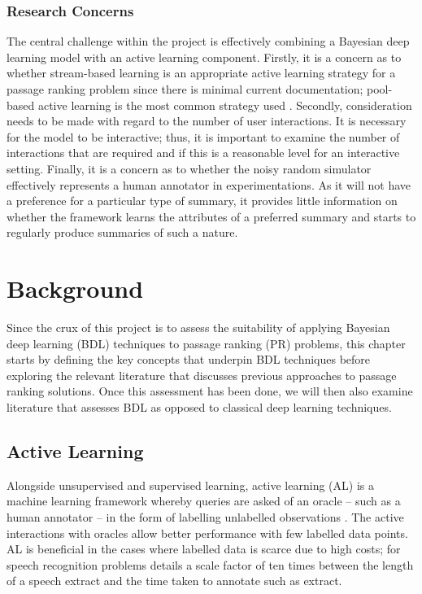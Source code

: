 \documentclass[ %
                    author={James Stephenson},
                supervisor={Dr. Edwin Simpson},
                    degree={MSc},
                     title={PROJECT PLAN},
                  subtitle={Bayesian Deep Learning For Extractive Test Summarisation},
                      type={},
                      year={2022}]{../additions/dissertation}
\begin{document}
			\subsection{Research Concerns}
			\label{chap:introduction:prop_approach:concerns}

				The central challenge within the project is effectively combining a Bayesian deep learning model with an active learning component. Firstly, it is a concern as to whether stream-based learning is an appropriate active learning strategy for a passage ranking problem since there is minimal current documentation; pool-based active learning is the most common strategy used \cite{Settles09}. Secondly, consideration needs to be made with regard to the number of user interactions. It is necessary for the model to be interactive; thus, it is important to examine the number of interactions that are required and if this is a reasonable level for an interactive setting. Finally, it is a concern as to whether the noisy random simulator effectively represents a human annotator in experimentations. As it will not have a preference for a particular type of summary, it provides little information on whether the framework learns the attributes of a preferred summary and starts to regularly produce summaries of such a nature.
		
		

		
	
	\chapter{Background}
	\label{chap:literaturereview}
		
	Since the crux of this project is to assess the suitability of applying Bayesian deep learning (BDL) techniques to passage ranking (PR) problems, this chapter starts by defining the key concepts that underpin BDL techniques before exploring the relevant literature that discusses previous approaches to passage ranking solutions. Once this assessment has been done, we will then also examine literature that assesses BDL as opposed to classical deep learning techniques.
		
		
		\section{Active Learning}
		\label{chap:literaturereview:active}
		
		Alongside unsupervised and supervised learning, active learning (AL) is a machine learning framework whereby queries are asked of an oracle – such as a human annotator – in the form of labelling unlabelled observations \cite{Settles09}. The active interactions with oracles allow better performance with few labelled data points. AL is beneficial in the cases where labelled data is scarce due to high costs; for speech recognition problems \cite{Zhu05} details a scale factor of ten times between the length of a speech extract and the time taken to annotate such as extract.
		
\end{document}
